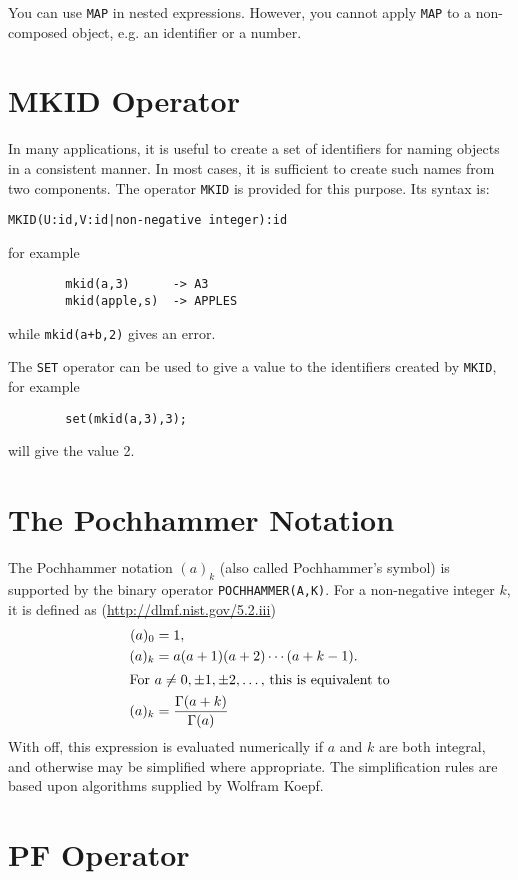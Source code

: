 You can use \texttt{MAP} in nested expressions. However, you cannot
apply \texttt{MAP} to a non-composed object, e.g. an identifier or a number.


\section{MKID Operator}
\hypertarget{operator:MKID}{}
In many applications, it is useful to create a set of identifiers for
naming objects in a consistent manner. In most cases, it is sufficient to
create such names from two components. The operator \texttt{MKID} is provided
for this purpose. Its syntax is:
\begin{verbatim}
MKID(U:id,V:id|non-negative integer):id
\end{verbatim}
for example
\begin{verbatim}
        mkid(a,3)      -> A3
        mkid(apple,s)  -> APPLES
\end{verbatim}
while \texttt{mkid(a+b,2)} gives an error.

The \texttt{SET} operator can be used to give a value to the
identifiers created by \texttt{MKID}, for example
\begin{verbatim}
        set(mkid(a,3),3);
\end{verbatim}
will give  the value 2.


\section{The Pochhammer Notation}

The Pochhammer notation $(a)_k$ (also called Pochhammer's symbol) is supported by the binary operator \texttt{POCHHAMMER(A,K)}.
For a non-negative integer $k$, it is defined as (\url{http://dlmf.nist.gov/5.2.iii})
\begin{align*}
  (a)_0 &= 1, \\
  (a)_k &= a(a+1)(a+2)\cdots(a+k-1).\\
\intertext{For $a\not=0,\pm1,\pm2,\dots$, this is equivalent to}
  (a)_k &= \frac{\Gamma(a+k)}{\Gamma(a)}
\end{align*}
With  off, this expression is evaluated
numerically if $a$ and $k$ are both integral, and otherwise may be
simplified where appropriate.  The simplification rules are based upon
algorithms supplied by Wolfram Koepf.%


\section{PF Operator}
\hypertarget{operator:PF}{}

